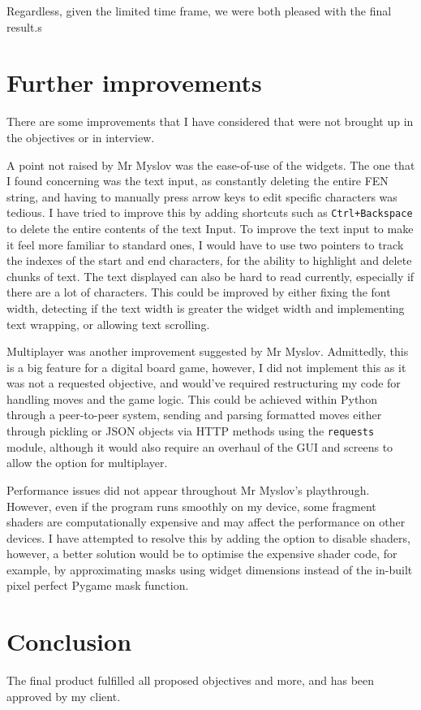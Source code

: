 \documentclass[../main/main.tex]{subfiles}
\begin{document}
\bigskip

\noindent Regardless, given the limited time frame, we were both pleased with the final result.s

\section{Further improvements}
There are some improvements that I have considered that were not brought up in the objectives or in interview.

A point not raised by Mr Myslov was the ease-of-use of the widgets. The one that I found concerning was the text input, as constantly deleting the entire FEN string, and having to manually press arrow keys to edit specific characters was tedious. I have tried to improve this by adding shortcuts such as \verb|Ctrl+Backspace| to delete the entire contents of the text Input. To improve the text input to make it feel more familiar to standard ones, I would have to use two pointers to track the indexes of the start and end characters, for the ability to highlight and delete chunks of text. The text displayed can also be hard to read currently, especially if there are a lot of characters. This could be improved by either fixing the font width, detecting if the text width is greater the widget width and implementing text wrapping, or allowing text scrolling.

Multiplayer was another improvement suggested by Mr Myslov. Admittedly, this is a big feature for a digital board game, however, I did not implement this as it was not a requested objective, and would've required restructuring my code for handling moves and the game logic. This could be achieved within Python through a peer-to-peer system, sending and parsing formatted moves either through pickling or JSON objects via HTTP methods using the \lstinline{requests} module, although it would also require an overhaul of the GUI and screens to allow the option for multiplayer.

Performance issues did not appear throughout Mr Myslov's playthrough. However, even if the program runs smoothly on my device, some fragment shaders are computationally expensive and may affect the performance on other devices. I have attempted to resolve this by adding the option to disable shaders, however, a better solution would be to optimise the expensive shader code, for example, by approximating masks using widget dimensions instead of the in-built pixel perfect Pygame mask function.

\section{Conclusion}
The final product fulfilled all proposed objectives and more, and has been approved by my client.
\end{document}
